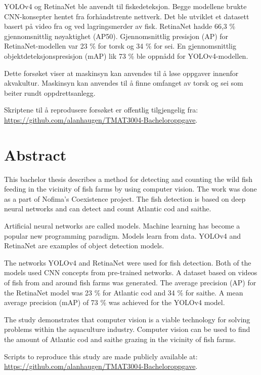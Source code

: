 YOLOv4 og RetinaNet ble anvendt til fiskedeteksjon. Begge modellene brukte CNN-konsepter hentet fra forhåndstrente nettverk. Det ble utviklet et datasett basert på video fra og ved lagringsmerder av fisk. RetinaNet hadde 66,3 \% gjennomsnittlig nøyaktighet (AP50). Gjennomsnittlig presisjon (AP) for RetinaNet-modellen var 23 \% for torsk og 34 \% for sei. En gjennomsnittlig objektdeteksjonspresisjon (mAP) lik 73 \% ble oppnådd for YOLOv4-modellen.

Dette forsøket viser at maskinsyn kan anvendes til å løse oppgaver innenfor akvakultur. Maskinsyn kan anvendes til å finne omfanget av torsk og sei som beiter rundt oppdrettsanlegg.%

Skriptene til å reprodusere forsøket er offentlig tilgjengelig fra: \\ \url{https://github.com/alanhaugen/TMAT3004-Bacheloroppgave}.

\section*{Abstract}

This bachelor thesis describes a method for detecting and counting the wild fish feeding in the vicinity of fish farms by using computer vision. The work was done as a part of Nofima's Coexistence project. The fish detection is based on deep neural networks and can detect and count Atlantic cod and saithe.

Artificial neural networks are called models. Machine learning has become a popular new programming paradigm. Models learn from data. YOLOv4 and RetinaNet are examples of object detection models.

The networks YOLOv4 and RetinaNet were used for fish detection. Both of the models used CNN concepts from pre-trained networks. A dataset based on videos of fish from and around fish farms was generated. The average precision (AP) for the RetinaNet model was 23 \% for Atlantic cod and 34 \% for saithe. A mean average precision (mAP) of 73 \% was achieved for the YOLOv4 model.

The study demonstrates that computer vision is a viable technology for solving problems within the aquaculture industry. Computer vision can be used to find the amount of Atlantic cod and saithe grazing in the vicinity of fish farms.

Scripts to reproduce this study are made publicly available at: \\ \url{https://github.com/alanhaugen/TMAT3004-Bacheloroppgave}.

